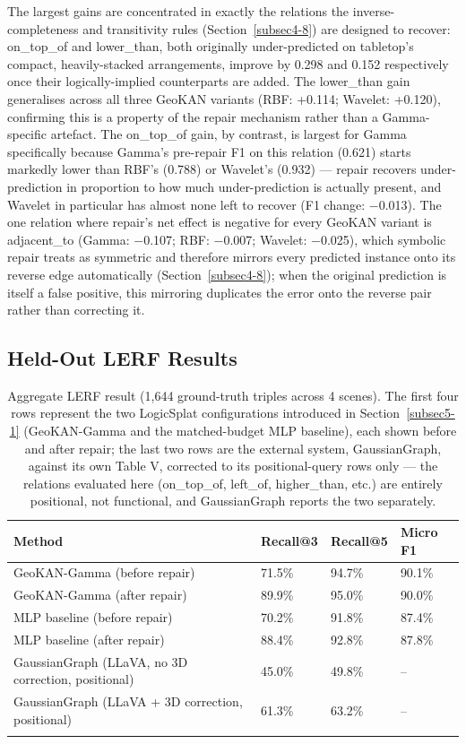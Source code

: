 \documentclass[sn-mathphys,Numbered]{sn-jnl}
\begin{document}
The largest gains are concentrated in exactly the relations the inverse-completeness and transitivity rules (Section~\ref{subsec4-8}) are designed to recover: on\_top\_of and lower\_than, both originally under-predicted on tabletop's compact, heavily-stacked arrangements, improve by 0.298 and 0.152 respectively once their logically-implied counterparts are added. The lower\_than gain generalises across all three GeoKAN variants (RBF: +0.114; Wavelet: +0.120), confirming this is a property of the repair mechanism rather than a Gamma-specific artefact. The on\_top\_of gain, by contrast, is largest for Gamma specifically because Gamma's pre-repair F1 on this relation (0.621) starts markedly lower than RBF's (0.788) or Wavelet's (0.932) --- repair recovers under-prediction in proportion to how much under-prediction is actually present, and Wavelet in particular has almost none left to recover (F1 change: $-$0.013). The one relation where repair's net effect is negative for every GeoKAN variant is adjacent\_to (Gamma: $-$0.107; RBF: $-$0.007; Wavelet: $-$0.025), which symbolic repair treats as symmetric and therefore mirrors every predicted instance onto its reverse edge automatically (Section~\ref{subsec4-8}); when the original prediction is itself a false positive, this mirroring duplicates the error onto the reverse pair rather than correcting it.

\FloatBarrier
\subsection{Held-Out LERF Results}\label{subsec5-3}

\begin{table}[htbp]
\centering
\caption{Aggregate LERF result (1,644 ground-truth triples across 4 scenes). The first four rows represent the two LogicSplat configurations introduced in Section~\ref{subsec5-1} (GeoKAN-Gamma and the matched-budget MLP baseline), each shown before and after repair; the last two rows are the external system, GaussianGraph, against its own Table V, corrected to its positional-query rows only --- the relations evaluated here (on\_top\_of, left\_of, higher\_than, etc.) are entirely positional, not functional, and GaussianGraph reports the two separately.}\label{tab13}
\small
\begin{tabular}{@{}p{5cm}p{1.4cm}p{1.4cm}p{1.4cm}@{}}
\toprule
Method & Recall@3 & Recall@5 & Micro F1 \\
\midrule
GeoKAN-Gamma (before repair) & 71.5\% & 94.7\% & 90.1\% \\
\midrule
GeoKAN-Gamma (after repair) & 89.9\% & 95.0\% & 90.0\% \\
\midrule
MLP baseline (before repair) & 70.2\% & 91.8\% & 87.4\% \\
\midrule
MLP baseline (after repair) & 88.4\% & 92.8\% & 87.8\% \\
\midrule
GaussianGraph (LLaVA, no 3D correction, positional) & 45.0\% & 49.8\% & -- \\
\midrule
GaussianGraph (LLaVA + 3D correction, positional) & 61.3\% & 63.2\% & -- \\
\botrule
\end{tabular}
\end{table}
\end{document}
